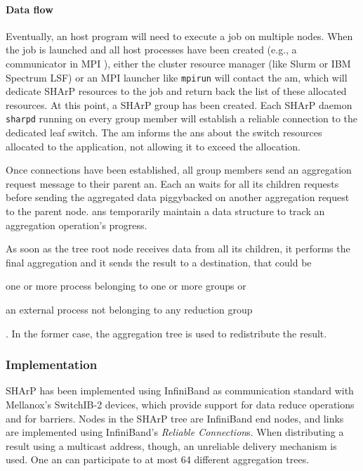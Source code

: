 \paragraph{Data flow}
Eventually, an host program will need to execute a job on multiple nodes.
When the job is launched and all host processes have been created (e.g., a communicator in MPI \cite{mpi}), either the cluster resource manager (like Slurm \cite{slurm} or IBM\textsuperscript{\textregistered} Spectrum LSF) or an MPI \cite{mpi} launcher like \texttt{mpirun} will contact the \gls{am}, which will dedicate SHArP \cite{sharp} resources to the job and return back the list of these allocated resources.
At this point, a SHArP \cite{sharp} group has been created.
Each SHArP \cite{sharp} daemon \texttt{sharpd} running on every group member will establish a reliable connection to the dedicated leaf switch.
The \gls{am} informs the \glspl{an} about the switch resources allocated to the application, not allowing it to exceed the allocation.\par
Once connections have been established, all group members send an aggregation request message to their parent \gls{an}.
Each \gls{an} waits for all its children requests before sending the aggregated data piggybacked on another aggregation request to the parent node.
\glspl{an} temporarily maintain a data structure to track an aggregation operation's progress.\par
As soon as the tree root node receives data from all its children, it performs the final aggregation and it sends the result to a destination, that could be
\begin{mylist}
    \item one or more process belonging to one or more groups or
    \item an external process not belonging to any reduction group
\end{mylist}.
In the former case, the aggregation tree is used to redistribute the result.

\subsubsection{Implementation}
SHArP \cite{sharp} has been implemented using InfiniBand \cite{infiniband} as communication standard with Mellanox's SwitchIB-2 devices, which provide support for data reduce operations and for barriers.
Nodes in the SHArP \cite{sharp} tree are InfiniBand \cite{infiniband} end nodes, and links are implemented using InfiniBand's \cite{infiniband} \textit{Reliable Connection}s.
When distributing a result using a multicast address, though, an unreliable delivery mechanism is used.
One \gls{an} can participate to at most 64 different aggregation trees.

